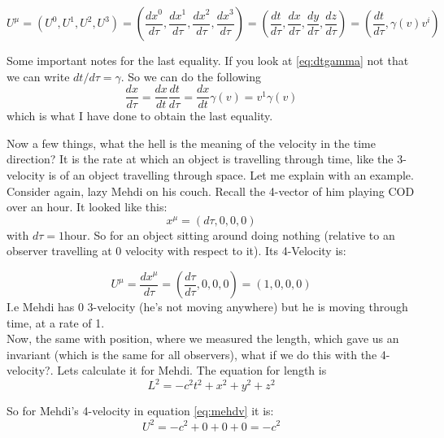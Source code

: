 \begin{equation}
  U^\mu = (U^0, U^1, U^2, U^3) = (\frac{dx^0}{d\tau}, \frac{dx^1}{d\tau},\frac{dx^2}{d\tau},\frac{dx^3}{d\tau}) = (\frac{dt}{d\tau}, \frac{dx}{d\tau},\frac{dy}{d\tau},\frac{dz}{d\tau}) = (\frac{dt}{d\tau}, \gamma(v) v^i)
\end{equation}

Some important notes for the last equality. If you look at \eqref{eq:dtgamma} not that we can write $dt/d\tau = \gamma$. So we can do the following
\begin{equation}
  \frac{dx}{d\tau} = \frac{dx}{dt} \frac{dt}{d\tau} = \frac{dx}{dt} \gamma(v) = v^1 \gamma(v)
\end{equation}
which is what I have done to obtain the last equality.

Now a few things, what the hell is the meaning of the velocity in the time direction? It is the rate at which an object is travelling through time, like the 3-velocity is of an object travelling through space. Let me explain with an example. Consider again, lazy Mehdi on his couch. Recall the 4-vector of him playing COD over an hour. It looked like this:
\begin{equation}
  x^\mu = (d\tau, 0,0,0) 
\end{equation}
with $d\tau = 1$hour. So for an object sitting around doing nothing (relative to an observer travelling at 0 velocity with respect to it). Its 4-Velocity is:

\begin{equation}
  U^\mu = \frac{dx^\mu}{d\tau} = (\frac{d\tau}{d\tau}, 0,0,0) = (1,0,0,0)
  \label{eq:mehdv}
\end{equation}
I.e Mehdi has 0 3-velocity (he's not moving anywhere) but he is moving through time, at a rate of 1. \\

Now, the same with position, where we measured the length, which gave us an invariant (which is the same for all observers), what if we do this with the 4-velocity?. Lets calculate it for Mehdi. The equation for length is
\begin{equation}
  L^2 = -c^2 t^2 + x^2 + y^2 + z^2
  \label{eq:4length}
\end{equation}

So for Mehdi's 4-velocity in equation \eqref{eq:mehdv} it is:
\begin{equation}
  U^2 = -c^2 + 0 + 0 +0 = -c^2 
  \label{eq:Ulength}
\end{equation}

